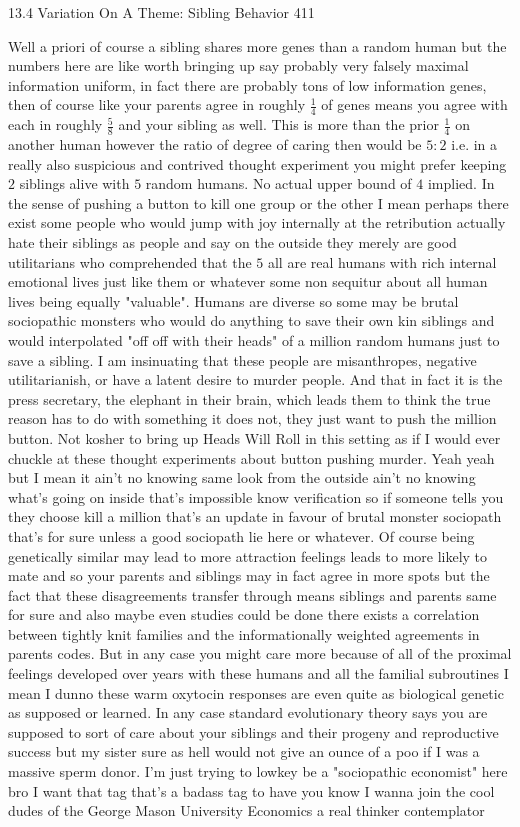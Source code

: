 13.4 Variation On A Theme: Sibling Behavior 411

Well a priori of course a sibling shares more genes than a random human but the numbers here are like worth bringing up say probably very falsely maximal information uniform, in fact there are probably tons of low information genes, then of course like your parents agree in roughly $\frac{1}{4}$ of genes means you agree with each in roughly $\frac{5}{8}$ and your sibling as well. This is more than the prior $\frac{1}{4}$ on another human however the ratio of degree of caring then would be $5:2$ i.e. in a really also suspicious and contrived thought experiment you might prefer keeping $2$ siblings alive with $5$ random humans. No actual upper bound of $4$ implied. In the sense of pushing a button to kill one group or the other I mean perhaps there exist some people who would jump with joy internally at the retribution actually hate their siblings as people and say on the outside they merely are good utilitarians who comprehended that the $5$ all are real humans with rich internal emotional lives just like them or whatever some non sequitur about all human lives being equally "valuable". Humans are diverse so some may be brutal sociopathic monsters who would do anything to save their own kin siblings and would interpolated "off off with their heads" of a million random humans just to save a sibling. I am insinuating that these people are misanthropes, negative utilitarianish, or have a latent desire to murder people. And that in fact it is the press secretary, the elephant in their brain, which leads them to think the true reason has to do with something it does not, they just want to push the million button. Not kosher to bring up Heads Will Roll in this setting as if I would ever chuckle at these thought experiments about button pushing murder. Yeah yeah but I mean it ain't no knowing same look from the outside ain't no knowing what's going on inside that's impossible know verification so if someone tells you they choose kill a million that's an update in favour of brutal monster sociopath that's for sure unless a good sociopath lie here or whatever. Of course being genetically similar may lead to more attraction feelings leads to more likely to mate and so your parents and siblings may in fact agree in more spots but the fact that these disagreements transfer through means siblings and parents same for sure and also maybe even studies could be done there exists a correlation between tightly knit families and the informationally weighted agreements in parents codes. But in any case you might care more because of all of the proximal feelings developed over years with these humans and all the familial subroutines I mean I dunno these warm oxytocin responses are even quite as biological genetic as supposed or learned. In any case standard evolutionary theory says you are supposed to sort of care about your siblings and their progeny and reproductive success but my sister sure as hell would not give an ounce of a poo if I was a massive sperm donor. I'm just trying to lowkey be a "sociopathic economist" here bro I want that tag that's a badass tag to have you know I wanna join the cool dudes of the George Mason University Economics a real thinker contemplator 